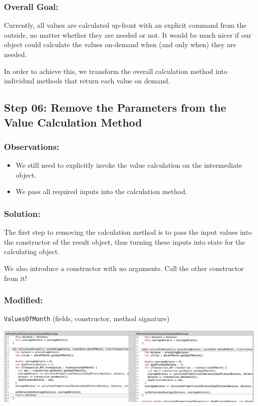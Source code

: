 \documentclass[a4paper,fleqn,titlepage,11pt]{article}
\begin{document}
\subsubsection*{Overall Goal:}

Currently, all values are calculated up-front with an explicit command from the outside, no matter whether they are needed or not. It would be much nicer if our object could calculate the values on-demand when (and only when) they are needed.

In order to achieve this, we transform the overall calculation method into individual methods that return each value on demand.

\subsection*{Step 06: Remove the Parameters from the Value Calculation Method}

\subsubsection*{Observations:}
\begin{itemize}
\item We still need to explicitly invoke the value calculation on the intermediate object. 
\item We pass all required inputs into the calculation method.
\end{itemize}

\subsubsection*{Solution:}

The first step to removing the calculation method is to pass the input values into the constructor of the result object, thus turning these inputs into state for the calculating object.

We also introduce a constructor with no arguments. Call the other constructor from it!

\subsubsection*{Modified:}

\texttt{ValuesOfMonth} (fields, constructor, method signature)

\includegraphics[width=1\textwidth]{CompareViews/05-06-2.png}
\end{document}
